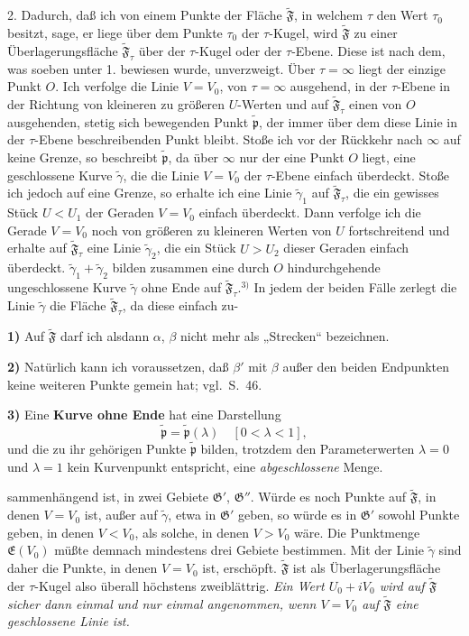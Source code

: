 \documentclass{article}
\begin{document}
2. Dadurch, daß ich von einem Punkte der Fläche $\widetilde{\mathfrak{F}}$, in welchem $\tau$ den Wert $\tau_0$ besitzt, sage, er liege über dem Punkte $\tau_0$ der $\tau$-Kugel, wird $\widetilde{\mathfrak{F}}$ zu einer Überlagerungsfläche $\widetilde{\mathfrak{F}}_\tau$ über der $\tau$-Kugel oder der $\tau$-Ebene. Diese ist nach dem, was soeben unter 1. bewiesen wurde, unverzweigt. Über $\tau = \infty$ liegt der einzige Punkt $O$. Ich verfolge die Linie $V = V_0$, von $\tau = \infty$ ausgehend, in der $\tau$-Ebene in der Richtung von kleineren zu größeren $U$-Werten und auf $\widetilde{\mathfrak{F}}_\tau$ einen von $O$ ausgehenden, stetig sich bewegenden Punkt $\tilde{\mathfrak{p}}$, der immer über dem diese Linie in der $\tau$-Ebene beschreibenden Punkt bleibt. Stoße ich vor der Rückkehr nach $\infty$ auf keine Grenze, so beschreibt $\tilde{\mathfrak{p}}$, da über $\infty$ nur der eine Punkt $O$ liegt, eine geschlossene Kurve $\tilde{\gamma}$, die die Linie $V = V_0$ der $\tau$-Ebene einfach überdeckt. Stoße ich jedoch auf eine Grenze, so erhalte ich eine Linie $\tilde{\gamma}_1$ auf $\widetilde{\mathfrak{F}}_\tau$, die ein gewisses Stück $U < U_1$ der Geraden $V = V_0$ einfach überdeckt. Dann verfolge ich die Gerade $V = V_0$ noch von größeren zu kleineren Werten von $U$ fortschreitend und erhalte auf $\widetilde{\mathfrak{F}}_\tau$ eine Linie $\tilde{\gamma}_2$, die ein Stück $U > U_2$ dieser Geraden einfach überdeckt. $\tilde{\gamma}_1 + \tilde{\gamma}_2$ bilden zusammen eine durch $O$ hindurchgehende ungeschlossene Kurve $\tilde{\gamma}$ ohne Ende auf $\widetilde{\mathfrak{F}}_\tau$.${}^{3)}$ In jedem der beiden Fälle zerlegt die Linie $\tilde{\gamma}$ die Fläche $\widetilde{\mathfrak{F}}_\tau$, da diese einfach zu-

\textbf{1)} Auf $\widetilde{\mathfrak{F}}$ darf ich alsdann $\alpha$, $\beta$ nicht mehr als „Strecken“ bezeichnen.

\textbf{2)} Natürlich kann ich voraussetzen, daß $\beta'$ mit $\beta$ außer den beiden Endpunkten keine weiteren Punkte gemein hat; vgl.\ S.~46.

\textbf{3)} Eine \textbf{Kurve ohne Ende} hat eine Darstellung
\[ \tilde{\mathfrak{p}} = \tilde{\mathfrak{p}}(\lambda) \quad [0 < \lambda < 1], \]
und die zu ihr gehörigen Punkte $\tilde{\mathfrak{p}}$ bilden, trotzdem den Parameterwerten $\lambda = 0$ und $\lambda = 1$ kein Kurvenpunkt entspricht, eine \emph{abgeschlossene} Menge.

sammenhängend ist, in zwei Gebiete $\mathfrak{G}'$, $\mathfrak{G}''$. Würde es noch Punkte auf $\widetilde{\mathfrak{F}}$, in denen $V = V_0$ ist, außer auf $\tilde{\gamma}$, etwa in $\mathfrak{G}'$ geben, so würde es in $\mathfrak{G}'$ sowohl Punkte geben, in denen $V < V_0$, als solche, in denen $V > V_0$ wäre. Die Punktmenge $\mathfrak{E}(V_0)$ müßte demnach mindestens drei Gebiete bestimmen. Mit der Linie $\tilde{\gamma}$ sind daher die Punkte, in denen $V = V_0$ ist, erschöpft. $\widetilde{\mathfrak{F}}$ ist als Überlagerungsfläche der $\tau$-Kugel also überall höchstens zweiblättrig. \emph{Ein Wert $U_0 + iV_0$ wird auf $\widetilde{\mathfrak{F}}$ sicher dann einmal und nur einmal angenommen, wenn $V = V_0$ auf $\widetilde{\mathfrak{F}}$ eine geschlossene Linie ist.}
\end{document}
